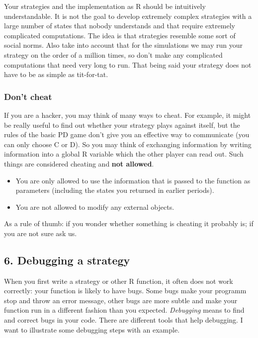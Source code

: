 \documentclass[]{article}
\begin{document}
Your strategies and the implementation as R should be intuitively
understandable. It is not the goal to develop extremely complex
strategies with a large number of states that nobody understands and
that require extremely complicated computations. The idea is that
strategies resemble some sort of social norms. Also take into account
that for the simulations we may run your strategy on the order of a
million times, so don't make any complicated computations that need very
long to run. That being said your strategy does not have to be as simple
as tit-for-tat.

\subsubsection{Don't cheat}

If you are a hacker, you may think of many ways to cheat. For example,
it might be really useful to find out whether your strategy plays
against itself, but the rules of the basic PD game don't give you an
effective way to communicate (you can only choose C or D). So you may
think of exchanging information by writing information into a global R
variable which the other player can read out. Such things are considered
cheating and \textbf{not allowed}.

\begin{itemize}
\itemsep1pt\parskip0pt
\item
  You are only allowed to use the information that is passed to the
  function as parameters (including the states you returned in earlier
  periods).
\item
  You are not allowed to modify any external objects.
\end{itemize}

As a rule of thumb: if you wonder whether something is cheating it
probably is; if you are not sure ask us.

\subsection{6. Debugging a strategy}

When you first write a strategy or other R function, it often does not
work correctly: your function is likely to have bugs. Some bugs make
your programm stop and throw an error message, other bugs are more
subtle and make your function run in a different fashion than you
expected. \emph{Debugging} means to find and correct bugs in your code.
There are different tools that help debugging. I want to illustrate some
debugging steps with an example.
\end{document}
